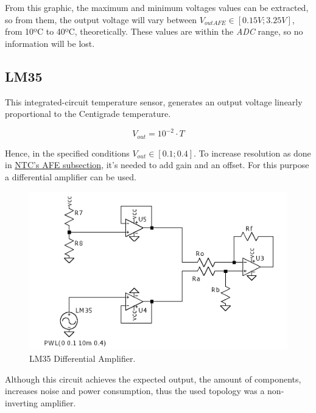 \documentclass[12pt]{article}
\begin{document}
    From this graphic, the maximum and minimum voltages values can be extracted, so from them, the output voltage 
    will vary between $V_{outAFE} \in [0.15V;3.25V]$, from 10ºC to 40ºC, theoretically. These values are within the \textit{ADC} range, so no information will be lost.
\subsection{LM35}

    This integrated-circuit temperature sensor, generates an output
    voltage linearly proportional to the Centigrade temperature.

    $$V_{out} = 10^{-2}\cdot T$$

    Hence, in the specified conditions $V_{out}\in[0.1;0.4]$. 
    To increase resolution as done in \hyperref[AFENTCCirc]{NTC's AFE subsection},
    it's needed to add gain and an offset. 
    For this purpose a differential amplifier can be used.  
    
    \begin{figure}[H] 
        \centering
        \includegraphics*[scale = 0.3]{images/DiffAmpLM35.png}
        \caption{LM35 Differential Amplifier.}
        \label{difafelm}
    \end{figure}

    Although this circuit achieves the expected output, the amount of components,
    increases noise and power consumption, thus the used topology was a non-inverting amplifier.
\end{document}
